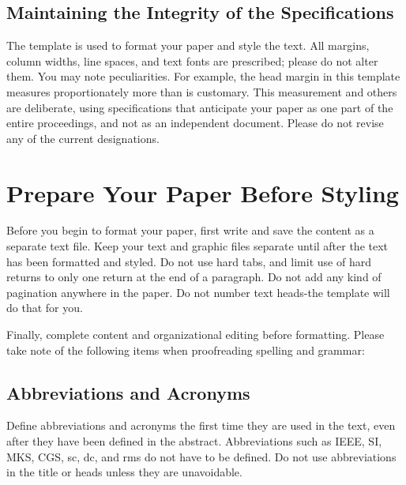 \documentclass[conference,pbalance]{iaria}
\begin{document}
\subsection{Maintaining the Integrity of the Specifications}
The template is used to format your paper and style the text. All margins, column widths, line spaces, and text fonts are prescribed; please do not alter them. You may note peculiarities. For example, the head margin in this template measures proportionately more than is customary. This measurement and others are deliberate, using specifications that anticipate your paper as one part of the entire proceedings, and not as an independent document. Please do not revise any of the current designations.

\section{Prepare Your Paper Before Styling}

Before you begin to format your paper, first write and save the content as a separate text file. Keep your text and graphic files separate until after the text has been formatted and styled. Do not use hard tabs, and limit use of hard returns to only one return at the end of a paragraph. Do not add any kind of pagination anywhere in the paper. Do not number text heads-the template will do that for you.

Finally, complete content and organizational editing before formatting. Please take note of the following items when proofreading spelling and grammar:

\subsection{Abbreviations and Acronyms}
Define abbreviations and acronyms the first time they are used in the text, even after they have been defined in the abstract. Abbreviations such as IEEE, SI, MKS, CGS, sc, dc, and rms do not have to be defined. Do not use abbreviations in the title or heads unless they are unavoidable.
\end{document}
